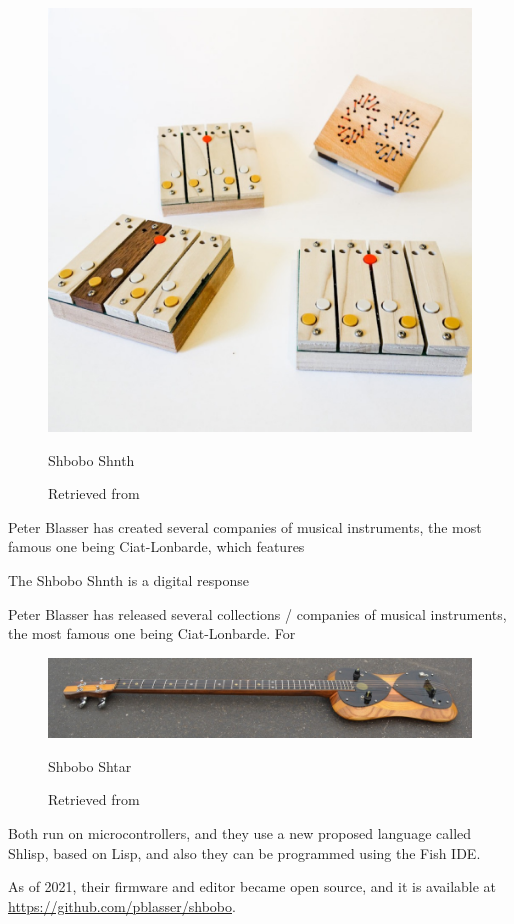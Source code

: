 \begin{figure}[ht]
  \centering
  \includegraphics[width=0.75\linewidth,height=0.25\textheight,keepaspectratio]{images/shbobo-shnth.jpg}
  \caption{Shbobo Shnth}
  \caption*{Retrieved from \cite{website-shbobo-current}}
  \label{fig:shbobo-shnth}
\end{figure}

Peter Blasser has created several companies of musical instruments, the most famous one being Ciat-Lonbarde, which features 

The Shbobo Shnth is a digital response 

Peter Blasser has released several collections / companies of musical instruments, the most famous one being Ciat-Lonbarde. For 

\begin{figure}[ht]
  \centering
    \includegraphics[width=0.75\linewidth,height=0.25\textheight,keepaspectratio]{images/shbobo-shtar.jpg}
  \caption{Shbobo Shtar}
  \caption*{Retrieved from \cite{website-shbobo-current}}
  \label{fig:shbobo-shtar}
\end{figure}

Both run on microcontrollers, and they use a new proposed language called Shlisp, based on Lisp, and also they can be programmed using the Fish IDE.

As of 2021, their firmware and editor became open source, and it is available at \url{https://github.com/pblasser/shbobo}.

